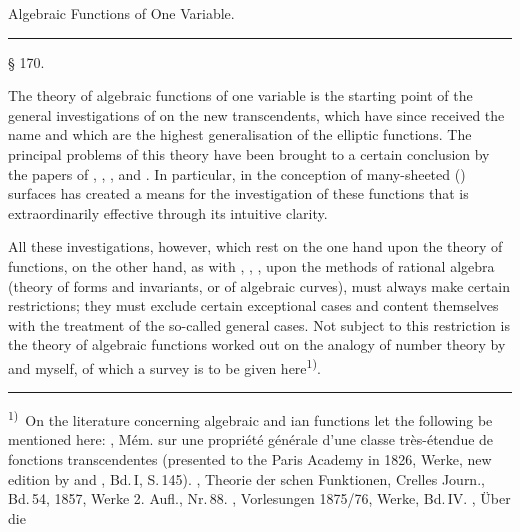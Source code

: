 
\begin{center}

\medskip
{\Large Algebraic Functions of One Variable.}
\end{center}

\rule{5em}{0.4pt}

\begin{center}
§ 170. 
\end{center}

The theory of algebraic functions of one variable is the starting point
of the general investigations of  on the new
transcendents, which have since received the name \glqq {}\grqq{} and which are the highest generalisation of the
elliptic functions. The principal problems of this theory have been
brought to a certain conclusion by the papers of ,
, ,  and
. In particular, in the conception of many-sheeted
() surfaces  has created a means for the
investigation of these functions that is extraordinarily effective
through its intuitive clarity.

All these investigations, however, which rest on the one hand upon the
theory of functions, on the other hand, as with ,
, , upon the methods of rational
algebra (theory of forms and invariants, or of algebraic curves), must
always make certain restrictions; they must exclude certain
\glqq exceptional cases\grqq{} and content themselves with the treatment
of the so-called general cases. Not subject to this restriction is the
theory of algebraic functions worked out on the analogy of number theory
by  and myself, of which a survey is to be given
here\textsuperscript{1)}.

\smallskip
\noindent\rule{5em}{0.4pt}

\noindent\textsuperscript{1)}~On the literature concerning algebraic and
ian functions let the following be mentioned here: ,
Mém. sur une propriété générale d'une classe très-étendue de fonctions
transcendentes (presented to the Paris Academy in 1826, Werke, new
edition by  and , Bd.\,I, S.\,145).
, Theorie der schen Funktionen, Crelles Journ.,
Bd.\,54, 1857, Werke 2. Aufl., Nr.\,88. ,
Vorlesungen 1875/76, Werke, Bd.\,IV. , Über die
